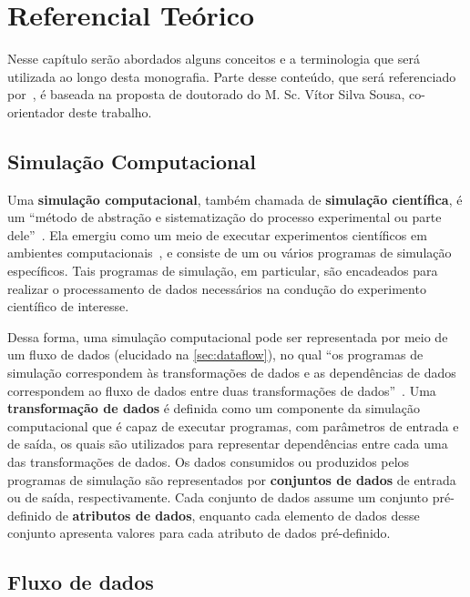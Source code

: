 
\chapter{Referencial Teórico}%
\label{chap:referencial-teorico}

Nesse capítulo serão abordados alguns conceitos e a terminologia que será utilizada ao longo desta monografia. Parte desse conteúdo, que será referenciado por~\cite{silva2015propostadoutorado}, é baseada na proposta de doutorado do M. Sc. Vítor Silva Sousa, co-orientador deste trabalho.

\section{Simulação Computacional}

Uma \textbf{simulação computacional}, também chamada de \textbf{simulação científica}, é um ``método de abstração e sistematização do processo experimental ou parte dele''~\cite{silva2015propostadoutorado,dias2015data}. Ela emergiu como um meio de executar experimentos científicos em ambientes computacionais~\cite{ogasawara2011algebraic}, e consiste de um ou vários programas de simulação específicos. Tais programas de simulação, em particular, são encadeados para realizar o processamento de dados necessários na condução do experimento científico de interesse.

Dessa forma, uma simulação computacional pode ser representada por meio de um fluxo de dados (elucidado na \autoref{sec:dataflow}), no qual ``os programas de simulação correspondem às transformações de dados e as dependências de dados correspondem ao fluxo de dados entre duas transformações de dados''~\cite{silva2015propostadoutorado,ogasawara2011algebraic}. Uma \textbf{transformação de dados} é definida como um componente da simulação computacional que é capaz de executar programas, com parâmetros de entrada e de saída, os quais são utilizados para representar dependências entre cada uma das transformações de dados. Os dados consumidos ou produzidos pelos programas de simulação são representados por \textbf{conjuntos de dados} de entrada ou de saída, respectivamente. Cada conjunto de dados assume um conjunto pré-definido de \textbf{atributos de dados}, enquanto cada elemento de dados desse conjunto apresenta valores para cada atributo de dados pré-definido.

\section{Fluxo de dados}%
\label{sec:dataflow}

